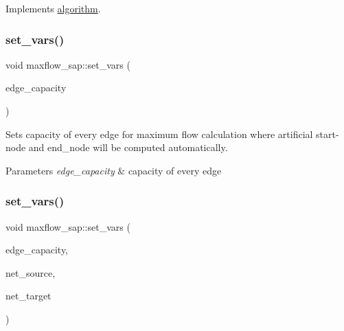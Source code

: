 Implements \mbox{\hyperlink{classalgorithm_a482eb28cacba018b5a86d3a819a50a2f}{algorithm}}.

\mbox{\label{classmaxflow__sap_ac50ba0330c169c7ce697947a76702e13}} 
\subsubsection{\texorpdfstring{set\+\_\+vars()}{set\_vars()}\hspace{0.1cm}{\footnotesize\ttfamily [1/2]}}
{\footnotesize\ttfamily void maxflow\+\_\+sap\+::set\+\_\+vars (\begin{DoxyParamCaption}\item[{const \mbox{\hyperlink{classedge__map}{edge\+\_\+map}}$<$ double $>$ \&}]{edge\+\_\+capacity }\end{DoxyParamCaption})}

Sets capacity of every edge for maximum flow calculation where artificial start-\/node and end\+\_\+node will be computed automatically.


\begin{DoxyParams}{Parameters}
{\em edge\+\_\+capacity} & capacity of every edge \\
\hline
\end{DoxyParams}
\mbox{\label{classmaxflow__sap_a936f6afa25de80046c7bd69dc47fdfa9}} 
\subsubsection{\texorpdfstring{set\+\_\+vars()}{set\_vars()}\hspace{0.1cm}{\footnotesize\ttfamily [2/2]}}
{\footnotesize\ttfamily void maxflow\+\_\+sap\+::set\+\_\+vars (\begin{DoxyParamCaption}\item[{const \mbox{\hyperlink{classedge__map}{edge\+\_\+map}}$<$ double $>$ \&}]{edge\+\_\+capacity,  }\item[{const \mbox{\hyperlink{classnode}{node}} \&}]{net\+\_\+source,  }\item[{const \mbox{\hyperlink{classnode}{node}} \&}]{net\+\_\+target }\end{DoxyParamCaption})}

